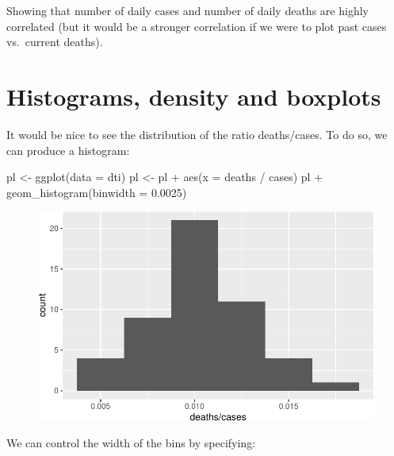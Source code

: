\documentclass[
  letterpaper,
  DIV=11,
  numbers=noendperiod]{scrreprt}
\newenvironment{Shaded}{\begin{snugshade}}{\end{snugshade}}
\newcommand{\AttributeTok}[1]{\textcolor[rgb]{0.40,0.45,0.13}{#1}}
\newcommand{\FloatTok}[1]{\textcolor[rgb]{0.68,0.00,0.00}{#1}}
\newcommand{\FunctionTok}[1]{\textcolor[rgb]{0.28,0.35,0.67}{#1}}
\newcommand{\NormalTok}[1]{\textcolor[rgb]{0.00,0.23,0.31}{#1}}
\newcommand{\OtherTok}[1]{\textcolor[rgb]{0.00,0.23,0.31}{#1}}
\newcommand{\SpecialCharTok}[1]{\textcolor[rgb]{0.37,0.37,0.37}{#1}}
\begin{document}
Showing that number of daily cases and number of daily deaths are highly
correlated (but it would be a stronger correlation if we were to plot
past cases vs.~current deaths).

\hypertarget{histograms-density-and-boxplots}{%
\section{Histograms, density and
boxplots}\label{histograms-density-and-boxplots}}

It would be nice to see the distribution of the ratio deaths/cases. To
do so, we can produce a histogram:

\begin{Shaded}
\begin{Highlighting}[]
\NormalTok{pl }\OtherTok{\textless{}{-}} \FunctionTok{ggplot}\NormalTok{(}\AttributeTok{data =}\NormalTok{ dti)}
\NormalTok{pl }\OtherTok{\textless{}{-}}\NormalTok{ pl }\SpecialCharTok{+} \FunctionTok{aes}\NormalTok{(}\AttributeTok{x =}\NormalTok{ deaths }\SpecialCharTok{/}\NormalTok{ cases)  }
\NormalTok{pl }\SpecialCharTok{+} \FunctionTok{geom\_histogram}\NormalTok{(}\AttributeTok{binwidth =} \FloatTok{0.0025}\NormalTok{) }
\end{Highlighting}
\end{Shaded}

\begin{figure}[H]

{\centering \includegraphics{./01-dataviz_files/figure-pdf/unnamed-chunk-10-1.pdf}

}

\end{figure}

We can control the width of the bins by specifying:
\end{document}
